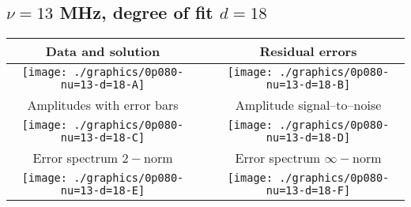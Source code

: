 

% 

\clearpage{}
\break{}

\subsection{$\nu = 13$ MHz, degree of fit $d = 18$}

\begin{table}[h]
    \begin{center}
        \begin{tabular}{ccc}
            Data and solution & \quad & Residual errors \\\hline
            \texttt{[image: ./graphics/0p080-nu=13-d=18-A]} &&
            \texttt{[image: ./graphics/0p080-nu=13-d=18-B]} \\[15pt]
            Amplitudes with error bars && Amplitude signal--to--noise \\\hline
            \texttt{[image: ./graphics/0p080-nu=13-d=18-C]} &&
            \texttt{[image: ./graphics/0p080-nu=13-d=18-D]} \\[15pt]
            Error spectrum $2-$norm && Error spectrum $\infty-$norm \\\hline
            \texttt{[image: ./graphics/0p080-nu=13-d=18-E]} &&
            \texttt{[image: ./graphics/0p080-nu=13-d=18-F]} \\[15pt]
        \end{tabular}
    \end{center}
\label{fig:elev=80, nu=13}
\end{table}



\endinput
